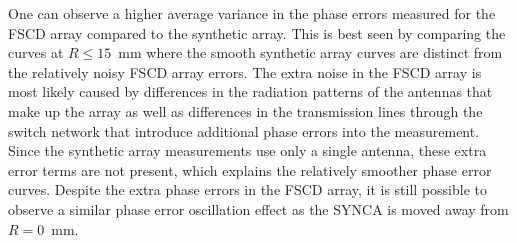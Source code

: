 One can observe a higher average variance in the phase errors measured for the FSCD array compared to the synthetic array. This is best seen by comparing the curves at $R\leq15$~mm where the smooth synthetic array curves are distinct from the relatively noisy FSCD array errors. The extra noise in the FSCD array is most likely caused by differences in the radiation patterns of the antennas that make up the array as well as differences in the transmission lines through the switch network that introduce additional phase errors into the measurement. Since the synthetic array measurements use only a single antenna, these extra error terms are not present, which explains the relatively smoother phase error curves. Despite the extra phase errors in the FSCD array, it is still possible to observe a similar phase error oscillation effect as the SYNCA is moved away from $R=0$~mm.

